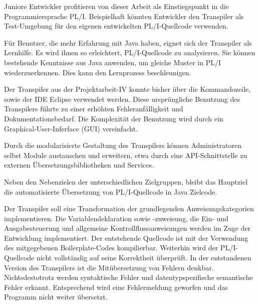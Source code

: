 Juniore Entwickler profitieren von dieser Arbeit als Einstiegspunkt in die Programmiersprache PL/I. Beispielhaft könnten Entwickler den Transpiler als Test-Umgebung für den eigenen entwickelten PL/I-Quellcode verwenden.

Für Benutzer, die mehr Erfahrung mit Java haben, eignet sich der Transpiler als Lernhilfe. Es wird ihnen so erleichtert, PL/I-Quellcode zu analysieren. Sie können bestehende Kenntnisse aus Java anwenden, um gleiche Muster in PL/I wiederzuerkennen. Dies kann den Lernprozess beschleunigen.

Der Transpiler aus der Projektarbeit-IV konnte bisher über die Kommandozeile, sowie der IDE Eclipse verwendet werden. Diese ursprüngliche Benutzung des Transpilers führte zu einer erhöhten Fehleranfälligkeit und Dokumentationsbedarf. Die Komplexität der Benutzung wird durch ein Graphical-User-Inferface (GUI) vereinfacht.

Durch die modularisierte Gestaltung des Transpilers können Administratoren selbst Module austauschen und erweitern, etwa durch eine API-Schnittstelle zu externen Übersetzungsbibliotheken und Services. 

Neben den Nebenzielen der unterschiedlichen Zielgruppen, bleibt das Hauptziel die automatisierte Übersetzung von PL/I-Quellcode in Java Zielcode.

Der Transpiler soll eine Transformation der grundlegenden Anweisungskategorien implementieren. Die Variablendeklaration sowie -zuweisung, die Ein- und Ausgabesteuerung und allgemeine Kontrollflussanweisungen werden im Zuge der Entwicklung implementiert. Der entstehende Quellcode ist mit der Verwendung des mitgegebenen Boilerplate-Codes kompilierbar. Weiterhin wird der PL/I-Quellcode nicht vollständig auf seine Korrektheit überprüft. In der entstandenen Version des Transpilers ist die Mitübersetzung von Fehlern denkbar. Nichtsdestotrotz werden syntaktische Fehler und datentypspezifische semantische Fehler erkannt. Entsprechend wird eine Fehlermeldung geworfen und das Programm nicht weiter übersetzt.

